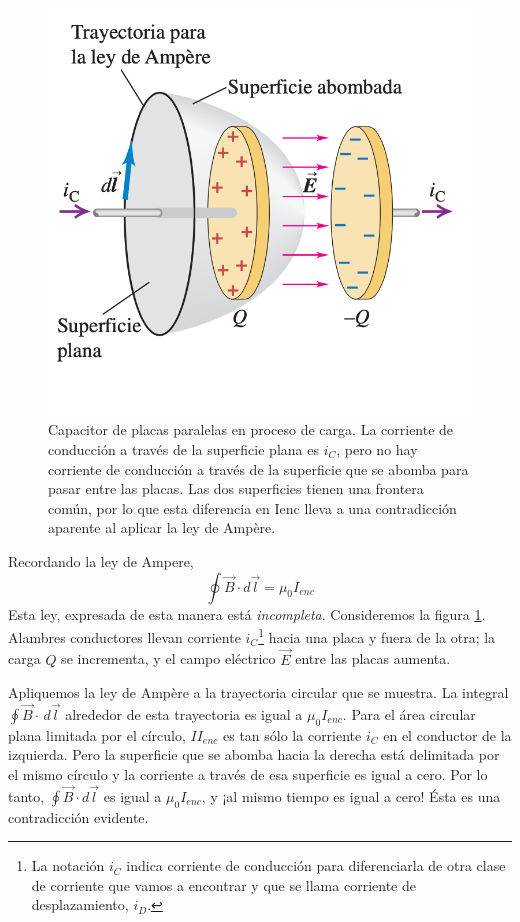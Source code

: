 \begin{figure}[h]
\centering
\includegraphics[scale=0.5]{fig/corriente-desplazamiento}
\caption{ Capacitor de placas paralelas en proceso de carga. La corriente de conducción a través de la superficie plana es $i_C$, pero no hay corriente de conducción a través de la superficie que se abomba para pasar entre las placas. Las dos superficies tienen una frontera común, por lo que esta diferencia en Ienc lleva a una contradicción aparente al aplicar la ley de Ampère.}
\label{fig:corriente-desplazamiento}
\end{figure}

Recordando la ley de Ampere, $$\oint\vec{B}\cdot d\vec{l}=\mu_0I_{enc}$$ Esta ley, expresada de esta manera está \textit{incompleta}. Consideremos la figura \ref{fig:corriente-desplazamiento}. Alambres conductores llevan corriente $i_C$\footnote{La notación $i_C$ indica corriente de conducción para diferenciarla de otra clase de corriente que vamos a encontrar y que se llama corriente de desplazamiento, $i_D$.} hacia una placa y fuera de la otra; la carga $Q$ se incrementa, y el campo eléctrico $\vec{E}$ entre las placas aumenta.

Apliquemos la ley de Ampère a la trayectoria circular que se muestra.  La integral $\oint\vec{B}\cdot\, d\vec{l}$ alrededor de esta trayectoria es igual a $\mu_0I_{enc}$. Para el área circular plana limitada por el círculo, $II_{enc}$ es tan sólo la corriente $i_C$ en el conductor de la izquierda. Pero la superficie que se abomba hacia la derecha está delimitada por el mismo círculo y la corriente a través de esa superficie es igual a cero. Por lo tanto, $\oint\vec{B}\cdot d\vec{l}$ es igual a $\mu_0I_{enc}$, y ¡al mismo tiempo es igual a cero! Ésta es una contradicción evidente.

